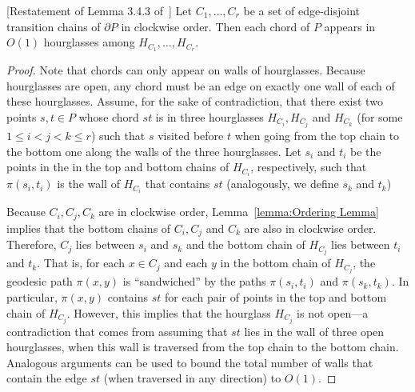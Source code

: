 \documentclass[a4paper,UKenglish]{lipics}
\newcommand{\p}[2]{\ensuremath{\pi(#1, #2)}}
\begin{document}
\begin{lemma}\label{lemma:Edges appear a constant number of times}
[Restatement of Lemma 3.4.3 of~\cite{aronov1993furthest}]
Let $C_1, \ldots, C_r$ be a set of edge-disjoint transition chains of $\partial P$ in clockwise order. Then each chord of $P$ appears in $O(1)$ hourglasses among $H_{C_1}, \ldots, H_{C_r}$.
\end{lemma}
\begin{proof}
Note that chords can only appear on walls of hourglasses. Because  hourglasses are open, any chord must be an edge on exactly one wall of each of these hourglasses. Assume, for the sake of contradiction, that there exist two points $s,t\in P$ whose chord $st$ is in three hourglasses $H_{C_i}, H_{C_j}$ and $H_{C_k}$ (for some $1\leq i < j < k\leq r$) such that $s$ visited before $t$ when going from the top chain to the bottom one along the walls of the three hourglasses.
Let $s_i$ and $t_i$ be the points in the in the top and bottom chains of $H_{C_i}$, respectively, such that $\p{s_i}{t_i}$ is the wall of $H_{C_i}$ that contains $st$ (analogously, we define $s_k$ and $t_k$)

Because $C_i, C_j, C_k$ are in clockwise order, Lemma~\ref{lemma:Ordering Lemma} implies that the bottom chains of $C_i, C_j$ and $C_k$ are also in clockwise order. Therefore, $C_j$ lies between $s_i$ and $s_k$ and the bottom chain of $H_{C_j}$ lies between $t_i$ and $t_k$. 
That is, for each $x\in C_j$ and each $y$ in the bottom chain of $H_{C_j}$, the geodesic path $\p{x}{y}$ is ``sandwiched'' by the paths $\p{s_i}{t_i}$ and $\p{s_k}{t_k}$.
In particular, $\p{x}{y}$ contains $st$ for each pair of points in the top and bottom chain of $H_{C_j}$.
However, this implies that the hourglass $H_{C_j}$ is not open---a contradiction that comes from assuming that $st$ lies in the  wall of three open hourglasses, when this wall is traversed from the top chain to the bottom chain. 
Analogous arguments can be used to bound the total number of walls that contain the edge $st$ (when traversed in any direction) to $O(1)$.
\end{proof}

\end{document}
